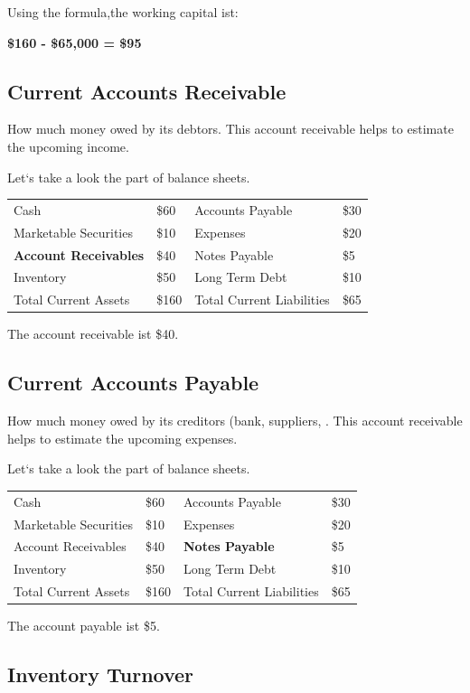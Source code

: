 \documentclass[]{book}
\begin{document}
Using the formula,the working capital ist:

\textbf{\$160 - \$65,000 = \$95 }

\subsection{Current Accounts
Receivable}\label{current-accounts-receivable}

How much money owed by its debtors. This account receivable helps to
estimate the upcoming income.

Let`s take a look the part of balance sheets.

\begin{longtable}[]{@{}llll@{}}
\toprule
Cash & \$60 & Accounts Payable & \$30\tabularnewline
Marketable Securities & \$10 & Expenses & \$20\tabularnewline
\textbf{Account Receivables } & \$40 & Notes Payable &
\$5\tabularnewline
Inventory & \$50 & Long Term Debt & \$10\tabularnewline
Total Current Assets & \$160 & Total Current Liabilities &
\$65\tabularnewline
\bottomrule
\end{longtable}

The account receivable ist \$40.

\subsection{Current Accounts Payable}\label{current-accounts-payable}

How much money owed by its creditors (bank, suppliers, . This account
receivable helps to estimate the upcoming expenses.

Let`s take a look the part of balance sheets.

\begin{longtable}[]{@{}llll@{}}
\toprule
Cash & \$60 & Accounts Payable & \$30\tabularnewline
Marketable Securities & \$10 & Expenses & \$20\tabularnewline
Account Receivables & \$40 & \textbf{Notes Payable } &
\$5\tabularnewline
Inventory & \$50 & Long Term Debt & \$10\tabularnewline
Total Current Assets & \$160 & Total Current Liabilities &
\$65\tabularnewline
\bottomrule
\end{longtable}

The account payable ist \$5.

\subsection{Inventory Turnover}\label{inventory-turnover}
\end{document}
